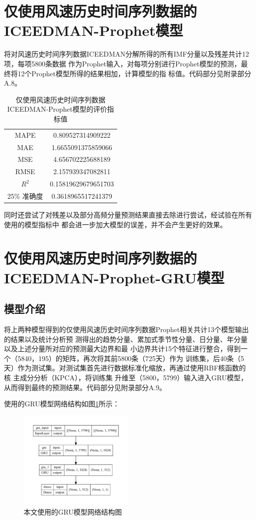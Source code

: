 \documentclass[AutoFakeBold]{LZUThesis}
\begin{document}
\section{仅使用风速历史时间序列数据的ICEEDMAN-Prophet模型}
将对风速历史时间序列数据ICEEDMAN分解所得的所有IMF分量以及残差共计12项，每项5800条数据
作为Prophet输入，对每项分别进行Prophet模型的预测，最终将12个Prophet模型所得的结果相加，计算模型的指
标值。代码部分见附录部分A.8。

\begin{table}[H]
    \centering
    \caption{仅使用风速历史时间序列数据ICEEDMAN-Prophet模型的评价指标值}
    \begin{tabular}{cc}
    \toprule
    MAPE & 0.809527314909222 \\
    MAE & 1.6655091375859066 \\
    MSE & 4.656702225688189 \\
    RMSE & 2.157939347082811 \\
    $R^2$ & 0.15819629679651703 \\
    25\% 准确度 & 0.3618965517241379 \\
    \bottomrule
    \end{tabular}
    \label{wind_iceemdan_prophet_result}
\end{table}

同时还尝试了对残差以及部分高频分量预测结果直接去除进行尝试，经试验在所有使用的模型指标中
都会进一步加大模型的误差，并不会产生更好的效果。

\section{仅使用风速历史时间序列数据的ICEEDMAN-Prophet-GRU模型}
\subsection{模型介绍}
将上两种模型得到的仅使用风速历史时间序列数据Prophet相关共计13个模型输出的结果以及统计分析预
测得出的趋势分量、累加式季节性分量、日分量、年分量以及上述分量所对应的预测最大边界和最
小边界共计15个特征进行整合，得到一个（5840，195）的矩阵，再次将其前5800条（725天）作为
训练集，后40条（5天）作为测试集。对测试集首先进行数据标准化缩放，再通过使用RBF核函数的核
主成分分析（KPCA），将训练集
升维至（5800，5799）输入进入GRU模型，从而得到最终的预测结果。代码部分见附录部分A.9。

使用的GRU模型网络结构如图\ref{fig_gru}所示：

\begin{figure}[H]
	\centering
    \includegraphics[width=0.5\textwidth]{figures/gru_model_plot.pdf}
    \caption{本文使用的GRU模型网络结构图}
    \label{fig_gru}
\end{figure}
\end{document}

